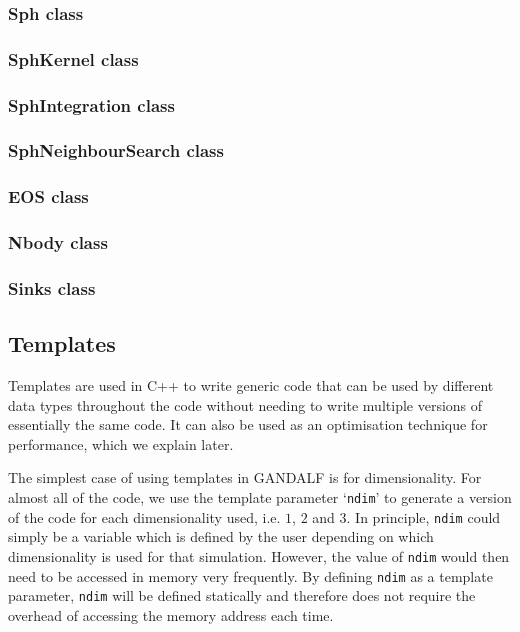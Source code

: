 \documentclass[a4paper]{article}
\newcommand{\var}[1]{\texttt{#1}}
\begin{document}
\subsubsection{Sph class}

\subsubsection{SphKernel class}

\subsubsection{SphIntegration class}

\subsubsection{SphNeighbourSearch class}

\subsubsection{EOS class}

\subsubsection{Nbody class}

\subsubsection{Sinks class}



\subsection{Templates}
Templates are used in C++ to write generic code that can be used by different data types throughout the code without needing to write multiple versions of essentially the same code.  It can also be used as an optimisation technique for performance, which we explain later.

The simplest case of using templates in GANDALF is for dimensionality.  For almost all of the code, we use the template parameter `\var{ndim}' to generate a version of the code for each dimensionality used, i.e. $1$, $2$ and $3$.  In principle, \var{ndim} could simply be a variable which is defined by the user depending on which dimensionality is used for that simulation.  However, the value of \var{ndim} would then need to be accessed in memory very frequently.  By defining \var{ndim} as a template parameter, \var{ndim} will be defined statically and therefore does not require the overhead of accessing the memory address each time.
\end{document}
